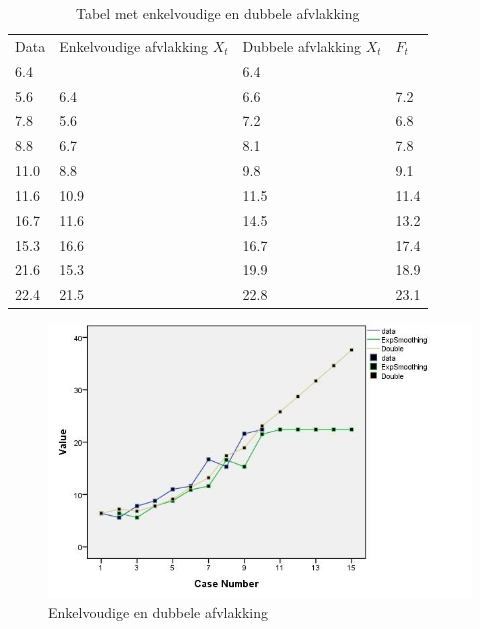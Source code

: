 \begin{table}
  \centering
  \begin{tabular}{|llll|}
    \hline
    Data & Enkelvoudige afvlakking $X_{t}$ & Dubbele afvlakking $X_{t}$ & $F_{t}$ \\
    6.4  & ~                      & 6.4              & ~                             \\
    5.6  & 6.4                    & 6.6              & 7.2                           \\
    7.8  & 5.6                    & 7.2              & 6.8                           \\
    8.8  & 6.7                    & 8.1              & 7.8                           \\
    11.0 & 8.8                    & 9.8              & 9.1                           \\
    11.6 & 10.9                   & 11.5             & 11.4                          \\
    16.7 & 11.6                   & 14.5             & 13.2                          \\
    15.3 & 16.6                   & 16.7             & 17.4                          \\
    21.6 & 15.3                   & 19.9             & 18.9                          \\
    22.4 & 21.5                   & 22.8             & 23.1                          \\ \hline
  \end{tabular}
  \caption{Tabel met enkelvoudige en dubbele afvlakking}
  \label{tab:doubleSingle}
\end{table}

\begin{figure}
	\centering
		\includegraphics[width=1.00\textwidth]{images/tijdreeksen/tijdreeks71.jpg}
	\caption{Enkelvoudige en dubbele afvlakking}
	\label{fig:tijdreeks71}
\end{figure}

